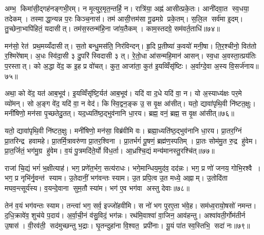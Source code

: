 अम्भ॒ किमा॑सी॒द्गह॑नङ्गभी॒रम्। न मृ॒त्युर॒मृत॒न्तर्\mbox{}हि॒ न। रात्रि॑या॒ अह्न॑ आसीत्प्रके॒तः। आनी॑दवा॒त स्व॒धया॒ तदेकम्। तस्माद्धा॒न्यन्न प॒रः किञ्च॒नास॑। तम॑ आसी॒त्तम॑सा गू॒ढमग्रे प्रके॒तम्। स॒लि॒ल सर्व॑मा इ॒दम्। तु॒च्छेना॒भ्वपि॑हितं॒ यदासीत्। तम॑स॒स्तन्म॑हि॒ना जा॑य॒तैकम्। काम॒स्तदग्रे॒ सम॑वर्त॒ताधि॑॥७४॥

मन॑सो॒ रेत॑ प्रथ॒मय्यँदासीत्। स॒तो बन्धु॒मस॑ति॒ निर॑विन्दन्। हृ॒दि प्र॒तीष्या॑ क॒वयो॑ मनी॒षा। ति॒र॒श्चीनो॒ वित॑तो र॒श्मिरे॑षाम्। अ॒धः स्वि॑दा॒सी ३ दु॒परि॑ स्विदासी ३ त्। रे॒तो॒धा आ॑सन्महि॒मान॑ आसन्। स्व॒धा अ॒वस्ता॒त्प्रय॑तिः प॒रस्तात्। को अ॒द्धा वे॑द॒ क इ॒ह प्र वो॑चत्। कुत॒ आजा॑ता॒ कुत॑ इ॒यव्विँसृ॑ष्टिः। अ॒र्वाग्दे॒वा अ॒स्य वि॒सर्ज॑नाय॥७५॥

अथा॒ को वे॑द॒ यत॑ आब॒भूव॑। इ॒यव्विँसृ॑ष्टि॒र्यत॑ आब॒भूव॑। यदि॑ वा द॒धे यदि॑ वा॒ न। यो अ॒स्याध्य॑क्षः पर॒मे व्यो॑मन्। सो अ॒ङ्ग वे॑द॒ यदि॑ वा॒ न वेद॑। किस्वि॒द्वन॒ङ्क उ॒ स वृ॒क्ष आ॑सीत्। यतो॒ द्यावा॑पृथि॒वी नि॑ष्टत॒क्षुः। मनी॑षिणो॒ मन॑सा पृ॒च्छतेदु॒तत्। यद॒ध्यति॑ष्ठ॒द्भुव॑नानि धा॒रय\sn{}। ब्रह्म॒ वनं॒ ब्रह्म॒ स वृ॒क्ष आ॑सीत्॥७६॥

यतो॒ द्यावा॑पृथि॒वी नि॑ष्टत॒क्षुः। मनी॑षिणो॒ मन॑सा॒ विब्र॑वीमि वः। ब्रह्मा॒ध्यति॑ष्ठ॒द्भुव॑नानि धा॒रय\sn{}। प्रा॒तर॒ग्निं प्रा॒तरिन्द्र हवामहे। प्रा॒तर्मि॒त्रावरु॑णा प्रा॒तर॒श्विना। प्रा॒तर्भगं॑ पू॒षणं॒ ब्रह्म॑ण॒स्पतिम्। प्रा॒तः सोम॑मु॒त रु॒द्र हु॑वेम। प्रा॒त॒र्जितं॒ भग॑मु॒ग्र हु॑वेम। व॒यं पु॒त्रमदि॑ते॒र्यो वि॑ध॒र्ता। आ॒ध्रश्चि॒द्यं मन्य॑मानस्तु॒रश्चि॑त्॥७७॥

राजा॑ चि॒द्यं भगं॑ भ॒क्षीत्याह॑। भग॒ प्रणे॑त॒र्भग॒ सत्य॑राधः। भगे॒मान्धिय॒मुद॑व॒ दद॑न्नः। भग॒ प्र णो॑ जनय॒ गोभि॒रश्वै। भग॒ प्र नृभि॑र्नृ॒वन्त॑ स्याम। उ॒तेदानीं॒ भग॑वन्तः स्याम। उ॒त प्रपि॒त्व उ॒त मध्ये॒ अह्नाम्। उ॒तोदि॑ता मघव॒न्त्सूर्य॑स्य। व॒यन्दे॒वाना सुम॒तौ स्या॑म। भग॑ ए॒व भग॑वा अस्तु देवाः॥७८॥

तेन॑ व॒यं भग॑वन्तः स्याम। तन्त्वा॑ भग॒ सर्व॒ इज्जो॑हवीमि। स नो॑ भग पुरए॒ता भ॑वे॒ह। सम॑ध्व॒रायो॒षसो॑ नमन्त। द॒धि॒क्रावे॑व॒ शुच॑ये प॒दाय॑। अ॒र्वा॒ची॒नं व॑सु॒विदं॒ भग॑न्नः। रथ॑मि॒वाश्वा॑ वा॒जिन॒ आव॑हन्तु। अश्वा॑वती॒र्गोम॑तीर्न उ॒षास॑। वी॒रव॑ती॒ सद॑मुच्छन्तु भ॒द्राः। घृ॒तन्दुहा॑ना वि॒श्वत॒ प्रपी॑नाः। यू॒यं पा॑त स्व॒स्तिभि॒ सदा॑ नः॥७९॥

\clearpage
{}


